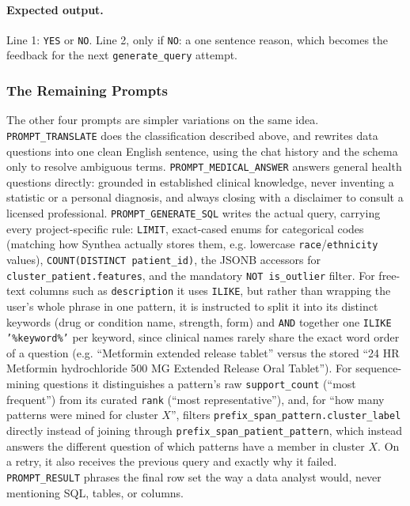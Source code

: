 \paragraph{Expected output.} Line 1: \texttt{YES} or \texttt{NO}. Line 2, only if \texttt{NO}: a one sentence reason, which becomes the feedback for the next \texttt{generate\_query} attempt.

\subsubsection*{The Remaining Prompts}

The other four prompts are simpler variations on the same idea. \texttt{PROMPT\_TRANSLATE} does the classification described above, and rewrites data questions into one clean English sentence, using the chat history and the schema only to resolve ambiguous terms. \texttt{PROMPT\_MEDICAL\_ANSWER} answers general health questions directly: grounded in established clinical knowledge, never inventing a statistic or a personal diagnosis, and always closing with a disclaimer to consult a licensed professional. \texttt{PROMPT\_GENERATE\_SQL} writes the actual query, carrying every project-specific rule: \texttt{LIMIT}, exact-cased enums for categorical codes (matching how Synthea actually stores them, e.g. lowercase \texttt{race}/\texttt{ethnicity} values), \texttt{COUNT(DISTINCT patient\_id)}, the JSONB accessors for \texttt{cluster\_patient.features}, and the mandatory \texttt{NOT is\_outlier} filter. For free-text columns such as \texttt{description} it uses \texttt{ILIKE}, but rather than wrapping the user's whole phrase in one pattern, it is instructed to split it into its distinct keywords (drug or condition name, strength, form) and \texttt{AND} together one \texttt{ILIKE '\%keyword\%'} per keyword, since clinical names rarely share the exact word order of a question (e.g. ``Metformin extended release tablet'' versus the stored ``24 HR Metformin hydrochloride 500 MG Extended Release Oral Tablet''). For sequence-mining questions it distinguishes a pattern's raw \texttt{support\_count} (``most frequent'') from its curated \texttt{rank} (``most representative''), and, for ``how many patterns were mined for cluster $X$'', filters \texttt{prefix\_span\_pattern.cluster\_label} directly instead of joining through \texttt{prefix\_span\_patient\_pattern}, which instead answers the different question of which patterns have a member in cluster $X$. On a retry, it also receives the previous query and exactly why it failed. \texttt{PROMPT\_RESULT} phrases the final row set the way a data analyst would, never mentioning SQL, tables, or columns.

